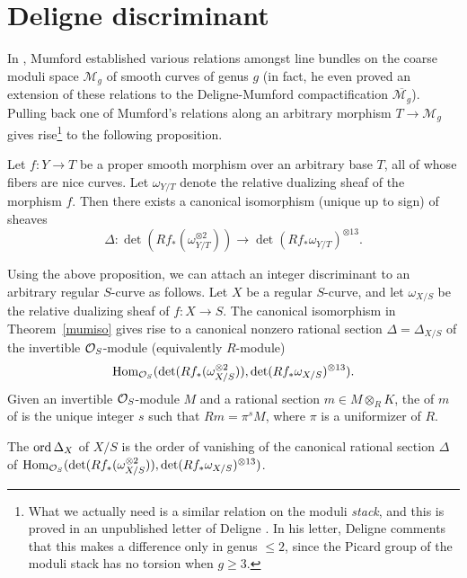 \section{Deligne discriminant}\label{defdeldisc}
In \cite[Theorem~5.10]{mumford}, Mumford established various relations amongst line bundles on the coarse moduli space $\mathcal{M}_g$ of smooth curves of genus $g$ (in fact, he even proved an extension of these relations to the Deligne-Mumford compactification $\overline{\mathcal{M}_g}$). Pulling back one of Mumford's relations along an arbitrary morphism $T \rightarrow \mathcal{M}_g$ gives rise{\footnote{What we actually need is a similar relation on the moduli {\textit{stack}}, and this is proved in an unpublished letter of Deligne \cite[Proposition]{deligne}. In his letter, Deligne comments that this  makes a difference only in genus $\leq 2$, since the Picard group of the moduli stack has no torsion when $g \geq 3$.}} to the following proposition. 
\begin{thm}\label{mumiso}\cite[Proposition]{deligne}
 Let $f \colon Y \rightarrow T$ be a proper smooth morphism over an arbitrary base $T$, all of whose fibers are nice curves. Let $\omega_{Y/T}$ denote the relative dualizing sheaf of the morphism $f$. Then there exists a canonical isomorphism (unique up to sign) of sheaves
 \[ \Delta \colon \det (Rf_* (\omega_{Y/T}^{\otimes 2})) \rightarrow \det (Rf_* \omega_{Y/T})^{\otimes 13} .\]
\end{thm}

Using the above proposition, we can attach an integer discriminant to an arbitrary regular $S$-curve as follows. Let $X$ be a regular $S$-curve, and let $\omega_{X/S}$ be the relative dualizing sheaf of $f \colon X \rightarrow S$. The canonical isomorphism in Theorem~\ref{mumiso} gives rise to a canonical nonzero rational section $\Delta = \Delta_{X/S}$ of the invertible $\mathcal{O}_S$-module (equivalently $R$-module)
 \[ \operatorname{Hom}_{\mathcal{O}_S}(\det (Rf_* (\omega_{X/S}^{\otimes 2})) , \det (Rf_* \omega_{X/S})^{\otimes 13}) .\] 
 Given an invertible $\mathcal{O}_S$-module $M$ and a rational section $m \in M \otimes_R K$, the {} of $m$ of  is the unique integer $s$ such that $R m = \pi^s M$, where $\pi$ is a uniformizer of $R$.
 
\begin{defin}
 The {} $\operatorname{ord} \Delta_X$ of $X/S$ is the order of vanishing of the canonical rational section $\Delta$ of $\operatorname{Hom}_{\mathcal{O}_S}(\det (Rf_* (\omega_{X/S}^{\otimes 2})) , \det (Rf_* \omega_{X/S})^{\otimes 13})$.
\end{defin}


